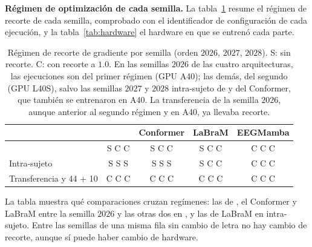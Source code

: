 \textbf{Régimen de optimización de cada semilla.} La tabla~\ref{tab:regimen} resume el
régimen de recorte de cada semilla, comprobado con el identificador de configuración de cada
ejecución, y la tabla~\ref{tab:hardware} el hardware en que se entrenó cada parte.

\begin{table}[H]
\centering
\caption{Régimen de recorte de gradiente por semilla (orden $2026$, $2027$, $2028$).
S: sin recorte. C: con recorte a $1.0$. En las semillas $2026$ de las cuatro arquitecturas,
las ejecuciones son del primer régimen (GPU A40); las demás, del segundo (GPU
L40S), salvo las semillas $2027$ y $2028$ intra-sujeto de \eegnet{} y del Conformer, que
también se entrenaron en A40. La transferencia de la semilla $2026$, aunque anterior al segundo régimen y
en A40, ya llevaba recorte.}
\label{tab:regimen}
\small
\begin{tabular}{lcccc}
\toprule
 & \textbf{\eegnet{}} & \textbf{Conformer} & \textbf{LaBraM} & \textbf{EEGMamba} \\
\midrule
\loso{}                          & S C C & S C C & S C C & C C C \\
Intra-sujeto                     & S S S & S S S & S C C & C C C \\
Transferencia y 44 + 10          & C C C & C C C & C C C & C C C \\
\bottomrule
\end{tabular}
\end{table}

La tabla muestra qué comparaciones cruzan regímenes: las de \eegnet{}, el Conformer y
LaBraM entre la semilla $2026$ y las otras dos en \loso{}, y las de LaBraM en
intra-sujeto. Entre las semillas de una misma fila sin cambio de letra no hay cambio de
recorte, aunque sí puede haber cambio de hardware.

